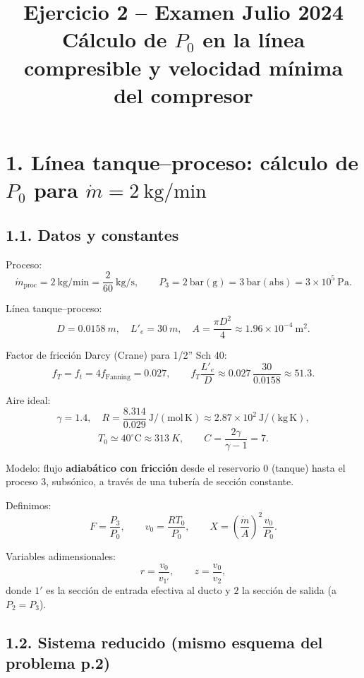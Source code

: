 \documentclass[11pt,a4paper]{article}
\begin{document}
\title{Ejercicio 2 -- Examen Julio 2024\\
Cálculo de $P_0$ en la línea compresible y velocidad mínima del compresor}
\author{}
\date{}
\maketitle

\section*{1. Línea tanque--proceso: cálculo de $P_0$ para $\dot m = 2\ \mathrm{kg/min}$}

\subsection*{1.1. Datos y constantes}

Proceso:
\[
\dot m_{\text{proc}} = 2\ \mathrm{kg/min} = \frac{2}{60}\ \mathrm{kg/s},
\qquad P_3 = 2\ \mathrm{bar(g)} = 3\ \mathrm{bar(abs)} = 3\times10^5\ \mathrm{Pa}.
\]

Línea tanque--proceso:
\[
D = \SI{0.0158}{m},\quad L'_e = \SI{30}{m},\quad
A = \frac{\pi D^2}{4} \approx 1.96\times10^{-4}\ \mathrm{m}^2.
\]

Factor de fricción Darcy (Crane) para 1/2'' Sch 40:
\[
f_T = f_t = 4 f_{\text{Fanning}} = 0.027,
\qquad
f_T\frac{L'_e}{D} \approx 0.027\,\frac{30}{0.0158} \approx 51.3.
\]

Aire ideal:
\[
\gamma = 1.4,\quad
R = \frac{8.314}{0.029}\ \mathrm{J/(mol\,K)} \approx 2.87\times10^2\ \mathrm{J/(kg\,K)},
\]
\[
T_0 \simeq 40^\circ\mathrm{C} \approx \SI{313}{K},
\qquad
C = \frac{2\gamma}{\gamma-1} = 7.
\]

Modelo: flujo \textbf{adiabático con fricción} desde el reservorio 0 (tanque) hasta el proceso 3, subsónico, a través de una tubería de sección constante.

Definimos:
\[
F = \frac{P_3}{P_0},\qquad
v_0 = \frac{R T_0}{P_0},\qquad
X = \left(\frac{\dot m}{A}\right)^2\frac{v_0}{P_0}.
\]

Variables adimensionales:
\[
r = \frac{v_0}{v_{1'}},\qquad
z = \frac{v_0}{v_2},
\]
donde $1'$ es la sección de entrada efectiva al ducto y $2$ la sección de salida (a $P_2 = P_3$).

\subsection*{1.2. Sistema reducido (mismo esquema del problema p.2)}
\end{document}
